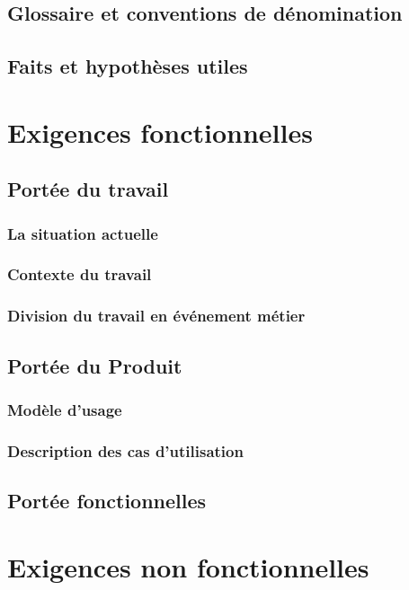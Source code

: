 \documentclass[a4paper, 12pt, french]{report}
\begin{document}
		\section{Glossaire et conventions de dénomination}
			

		\section{Faits et hypothèses utiles}
			

	\chapter{Exigences fonctionnelles}
		\section{Portée du travail}
			\subsection{La situation actuelle}
				
			\subsection{Contexte du travail}
				
			\subsection{Division du travail en événement métier}
				

		\section{Portée du Produit}
			\subsection{Modèle d'usage}
			\subsection{Description des cas d'utilisation}

		\section{Portée fonctionnelles}

	\chapter{Exigences non fonctionnelles}
\end{document}
